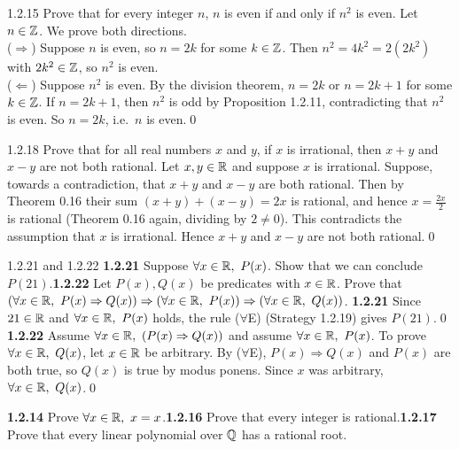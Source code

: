 \begin{bookex}[essential]{1.2.15}
Prove that for every integer $n$, $n$ is even if and only if $n^2$ is even.
\solution
Let $n\in\mathbb{Z}$. We prove both directions.\\
($\Rightarrow$) Suppose $n$ is even, so $n=2k$ for some $k\in\mathbb{Z}$. Then $n^2=4k^2=2(2k^2)$ with $2k^2\in\mathbb{Z}$, so $n^2$ is even.\\
($\Leftarrow$) Suppose $n^2$ is even. By the division theorem, $n=2k$ or $n=2k+1$ for some $k\in\mathbb{Z}$. If $n=2k+1$, then $n^2$ is odd by Proposition 1.2.11, contradicting that $n^2$ is even. So $n=2k$, i.e.\ $n$ is even.\qed
\end{bookex}

\begin{bookex}[essential]{1.2.18}
Prove that for all real numbers $x$ and $y$, if $x$ is irrational, then $x+y$ and $x-y$ are not both rational.
\solution
Let $x,y\in\mathbb{R}$ and suppose $x$ is irrational. Suppose, towards a contradiction, that $x+y$ and $x-y$ are both rational. Then by Theorem 0.16 their sum $(x+y)+(x-y)=2x$ is rational, and hence $x=\frac{2x}2$ is rational (Theorem 0.16 again, dividing by $2\ne0$). This contradicts the assumption that $x$ is irrational. Hence $x+y$ and $x-y$ are not both rational.\qed
\end{bookex}

\begin{bookex}[recommended]{1.2.21 and 1.2.22}
\textbf{1.2.21} Suppose $\forall x\in\mathbb{R},\ P(x)$. Show that we can conclude $P(21)$.\quad \textbf{1.2.22} Let $P(x),Q(x)$ be predicates with $x\in\mathbb{R}$. Prove that $(\forall x\in\R,\ P(x)\Rightarrow Q(x))\Rightarrow(\forall x\in\R,\ P(x))\Rightarrow(\forall x\in\R,\ Q(x))$.
\solution
\textbf{1.2.21} Since $21\in\mathbb{R}$ and $\forall x\in\mathbb{R},\ P(x)$ holds, the rule ($\forall$E) (Strategy 1.2.19) gives $P(21)$.\qed\\
\textbf{1.2.22} Assume $\forall x\in\mathbb{R},\ (P(x)\Rightarrow Q(x))$ and assume $\forall x\in\mathbb{R},\ P(x)$. To prove $\forall x\in\R,\ Q(x)$, let $x\in\mathbb{R}$ be arbitrary. By ($\forall$E), $P(x)\Rightarrow Q(x)$ and $P(x)$ are both true, so $Q(x)$ is true by modus ponens. Since $x$ was arbitrary, $\forall x\in\R,\ Q(x)$.\qed
\end{bookex}

\begin{trybox}[{1.2.14 (bonus), 1.2.16, 1.2.17 \fO}]
\textbf{1.2.14} Prove $\forall x\in\mathbb{R},\ x=x$.\quad \textbf{1.2.16} Prove that every integer is rational.\quad \textbf{1.2.17} Prove that every linear polynomial over $\mathbb{Q}$ has a rational root.
\end{trybox}

